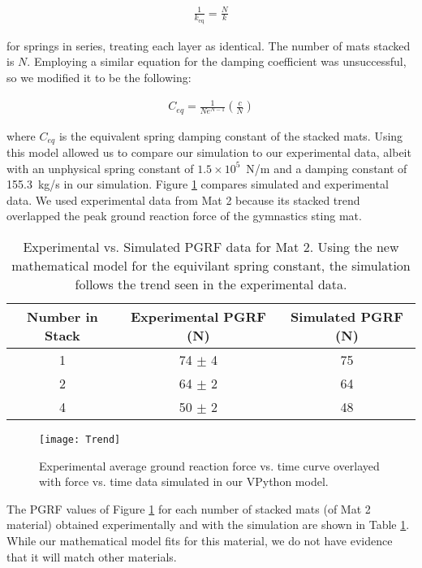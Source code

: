 \documentclass[12pt,aps,prb,preprint]{revtex4-1}   %
\begin{document}
\vspace{-6 mm}
\begin{eqnarray}
\frac{1}{k_\text{eq}}=\frac{N}{k}
\end{eqnarray}

\noindent for springs in series, treating each layer as identical. The number of mats stacked is $N$. Employing a similar equation for the damping coefficient was unsuccessful, so we modified it to be the following:

\vspace{-10 mm}
\begin{eqnarray}
C_{eq}=\frac{1}{Ne^{N-1}}  \left(\frac{c}{N}\right)
\end{eqnarray}

\noindent where $C_{eq}$ is the equivalent spring damping constant of the stacked mats. Using this model allowed us to compare our simulation to our experimental data, albeit with an unphysical spring constant of $1.5 \times10^5$~N/m and a damping constant of 155.3~kg/s in our simulation. Figure \ref{fig:overlay} compares simulated and experimental data. We used experimental data from Mat 2 because its stacked trend overlapped the peak ground reaction force of the gymnastics sting mat.

\begin{table}
	\begin{tabular}{ c | c | c}
	Number in Stack&Experimental PGRF (N)&Simulated PGRF (N)\\
	\hline
	1&74 $\pm$ 4 &75\\
	2&64 $\pm$ 2 &64\\
	4&50 $\pm$ 2 &48\\
	\end{tabular}
	\caption{Experimental vs. Simulated PGRF data for Mat 2. Using the new mathematical model for the equivilant spring constant, the simulation follows the trend seen in the experimental data.}
	\label{tab:geoff}
\end{table}

\begin{figure}[h]
	\centering
	\texttt{[image: Trend]}
	\caption{Experimental average ground reaction force vs. time curve overlayed with force vs. time data simulated in our VPython model.}
	\label{fig:overlay}
\end{figure}

The PGRF values of Figure \ref{fig:overlay} for each number of stacked mats (of Mat 2 material) obtained experimentally and with the simulation are shown in Table \ref{tab:geoff}. While our mathematical model fits for this material, we do not have evidence that it will match other materials.
\end{document}
